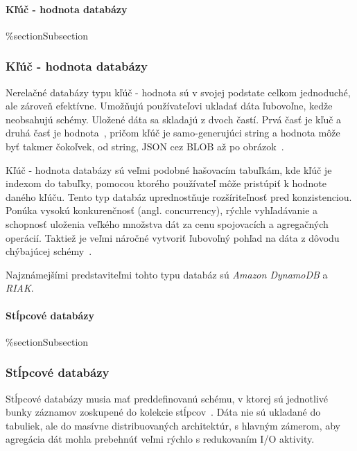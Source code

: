 %
%
{
	\paragraph{Kľúč - hodnota databázy}
}
{
	\%section{Subsection}
	\subsubsection{Kľúč - hodnota databázy}
}
\label{subsubsection:key_value_db}
Nerelačné databázy typu kľúč - hodnota sú v svojej podstate celkom jednoduché, ale zároveň efektívne. Umožňujú používateľovi ukladať dáta ľubovoľne, kedže neobsahujú schémy. Uložené dáta sa skladajú z dvoch častí. Prvá časť je kľuč a druhá časť je hodnota~\cite{NoSQLDBvsRealtionDB}, pričom kľúč je samo-generujúci string a hodnota môže byť takmer čokoľvek, od string, JSON cez BLOB až po obrázok~\cite{MongoDBvsMySQL2015}.

Kľúč - hodnota databázy sú veľmi podobné hašovacím tabuľkám, kde kľúč je indexom do tabuľky, pomocou ktorého používateľ môže pristúpiť k hodnote daného kľúču. Tento typ databáz uprednostňuje rozšíriteľnosť pred konzistenciou. Ponúka vysokú konkurenčnosť (angl. concurrency), rýchle vyhľadávanie a schopnosť uloženia veľkého množstva dát za cenu spojovacích a agregačných operácií. Taktiež je veľmi náročné vytvoriť ľubovoľný pohľad na dáta z dôvodu chýbajúcej schémy~\cite{NoSQLDBvsRealtionDB}.

Najznámejšími predstaviteľmi tohto typu databáz sú \textit{Amazon DynamoDB} a \textit{RIAK}.

%
%
{
	\paragraph{Stĺpcové databázy}
}
{
	\%section{Subsection}
	\subsubsection{Stĺpcové databázy}
}
\label{subsubsection:column_db}
Stĺpcové databázy musia mať preddefinovanú schému, v ktorej sú jednotlivé bunky záznamov zoskupené do kolekcie stĺpcov~\cite{MongoDBvsMySQL2015}. Dáta nie sú ukladané do tabuliek, ale do masívne distribuovaných architektúr, s hlavným zámerom, aby agregácia dát mohla prebehnúť veľmi rýchlo s redukovaním I/O aktivity.

